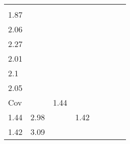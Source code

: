\documentclass[11pt]{article}
\begin{document}
\begin{longtable}[]{@{}llllllll@{}}
\begin{minipage}[t]{0.10\columnwidth}
\(\begin{array}{cc}1.93\\1.87\end{array}\)\strut
\end{minipage} & \begin{minipage}[t]{0.10\columnwidth}\raggedright
\(\begin{array}{cc}2.0\\2.06\end{array}\)\strut
\end{minipage} & \begin{minipage}[t]{0.10\columnwidth}\raggedright
\(\begin{array}{cc}2.05\\2.27\end{array}\)\strut
\end{minipage} & \begin{minipage}[t]{0.10\columnwidth}\raggedright
\(\begin{array}{cc}2.0\\2.01\end{array}\)\strut
\end{minipage} & \begin{minipage}[t]{0.10\columnwidth}\raggedright
\(\begin{array}{cc}2.03\\2.1\end{array}\)\strut
\end{minipage} & \begin{minipage}[t]{0.10\columnwidth}\raggedright
\(\begin{array}{cc}2.02\\2.05\end{array}\)\strut
\end{minipage}\tabularnewline
\begin{minipage}[t]{0.10\columnwidth}\raggedright
Cov\strut
\end{minipage} & \begin{minipage}[t]{0.10\columnwidth}\raggedright
\(\begin{array}{cc}1.16 & 1.44\\1.44 & 2.98\end{array}\)\strut
\end{minipage} & \begin{minipage}[t]{0.10\columnwidth}\raggedright
\(\begin{array}{cc}1.13 & 1.42\\1.42 & 3.09\end{array}\)\strut
\end{minipage} & \begin{minipage}[t]{0.10\columnwidth}\raggedright

\end{minipage}
\end{longtable}
\end{document}
